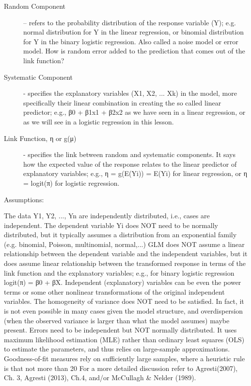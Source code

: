 \begin{description}
\item[Random Component] – refers to the probability distribution of the response variable (Y); e.g. normal distribution for Y in the linear regression, or binomial distribution for Y in the binary logistic regression.  Also called a noise model or error model.  How is random error added to the prediction that comes out of the link function?
\item[Systematic Component] - specifies the explanatory variables (X1, X2, ... Xk) in the model, more specifically their linear combination in creating the so called linear predictor; e.g., β0 + β1x1 + β2x2 as we have seen in a linear regression, or as we will see in a logistic regression in this lesson.
\item[Link Function, η or g(μ)] - specifies the link between random and systematic components. It says how the expected value of the response relates to the linear predictor of explanatory variables; e.g., η = g(E(Yi)) = E(Yi) for linear regression, or  η = logit(π) for logistic regression.
\end{description}

Assumptions:

The data Y1, Y2, ..., Yn are independently distributed, i.e., cases are independent.
The dependent variable Yi does NOT need to be normally distributed, but it typically assumes a distribution from an exponential family (e.g. binomial, Poisson, multinomial, normal,...)
GLM does NOT assume a linear relationship between the dependent variable and the independent variables, but it does assume linear relationship between the transformed response in terms of the link function and the explanatory variables; e.g., for binary logistic regression logit(π) = β0 + βX.
Independent (explanatory) variables can be even the power terms or some other nonlinear transformations of the original independent variables.
The homogeneity of variance does NOT need to be satisfied. In fact, it is not even possible in many cases given the model structure, and overdispersion (when the observed variance is larger than what the model assumes) maybe present.
Errors need to be independent but NOT normally distributed.
It uses maximum likelihood estimation (MLE) rather than ordinary least squares (OLS) to estimate the parameters, and thus relies on large-sample approximations.
Goodness-of-fit measures rely on sufficiently large samples, where a heuristic rule is that not more than 20%
For a more detailed discussion refer to Agresti(2007), Ch. 3, Agresti (2013), Ch.4, and/or McCullagh & Nelder (1989).


